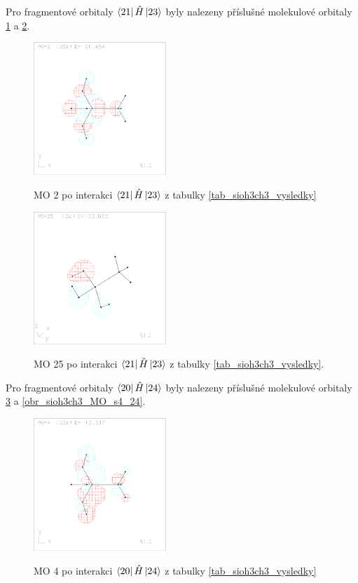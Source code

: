 \documentclass[
  digital, %
  table,   %
  lof,     %
  lot,     %
]{fithesis3}
\begin{document}
 \clearpage
 
  Pro fragmentové orbitaly $\bra{21}{\hat{H}}\ket{23}$ byly nalezeny příslušné molekulové orbitaly \ref{obr_sioh3ch3_MO_s3_2} a \ref{obr_sioh3ch3_MO_s3_25}.
  
  \begin{figure}[h]
\caption{MO 2 po interakci $\bra{21}{\hat{H}}\ket{23}$ z tabulky \ref{tab_sioh3ch3_vysledky}}
  \center
  \includegraphics[width=5cm]{sioh3ch3_obrazky/s3_2.eps}
  \label{obr_sioh3ch3_MO_s3_2}
  \end{figure}

\begin{figure}[h]
\caption{MO 25 po interakci $\bra{21}{\hat{H}}\ket{23}$ z tabulky \ref{tab_sioh3ch3_vysledky}.  }
  \center
  \includegraphics[width=5cm]{sioh3ch3_obrazky/s3_25.eps}
  \label{obr_sioh3ch3_MO_s3_25}
  \end{figure}
  
   Pro fragmentové orbitaly $\bra{20}{\hat{H}}\ket{24}$ byly nalezeny příslušné molekulové orbitaly \ref{obr_sioh3ch3_MO_s4_4} a \ref{obr_sioh3ch3_MO_s4_24}.
  
  \begin{figure}[h]
\caption{MO 4 po interakci $\bra{20}{\hat{H}}\ket{24}$ z tabulky \ref{tab_sioh3ch3_vysledky}}
  \center
  \includegraphics[width=5cm]{sioh3ch3_obrazky/s4_4.eps}
  \label{obr_sioh3ch3_MO_s4_4}
  \end{figure}
\end{document}
